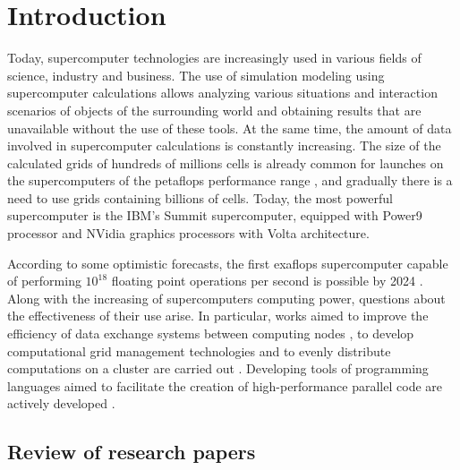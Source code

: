 \documentclass[
11pt,%
tightenlines,%
twoside,%
onecolumn,%
nofloats,%
nobibnotes,%
nofootinbib,%
superscriptaddress,%
noshowpacs,%
centertags]%
{revtex4}
\begin{document}
\maketitle


\section{Introduction}

Today, supercomputer technologies are increasingly used in various fields of science, industry and business. 
The use of simulation modeling using supercomputer calculations allows analyzing various situations and interaction scenarios of objects of the surrounding world and obtaining results that are unavailable without the use of these tools. 
At the same time, the amount of data involved in supercomputer calculations is constantly increasing. 
The size of the calculated grids of hundreds of millions cells is already common for launches on the supercomputers of the petaflops performance range \cite{Rettinger,Krappel}, and gradually there is a need to use grids containing billions of cells. 
Today, the most powerful supercomputer is the IBM's Summit supercomputer, equipped with Power9 processor and NVidia graphics processors with Volta architecture.

According to some optimistic forecasts, the first exaflops supercomputer capable of performing $ 10^{18} $ floating point operations per second is possible by 2024 \cite{Markidis}.
Along with the increasing of supercomputers computing power, questions about the effectiveness of their use arise. 
In particular, works aimed to improve the efficiency of data exchange systems between computing nodes \cite{Klenk,Abduljabbar}, to develop computational grid management technologies and to evenly distribute computations on a cluster are carried out \cite{Rybakov,Van,Benderskiy}. 
Developing tools of programming languages aimed to facilitate the creation of high-performance parallel code are actively developed \cite{Heller,Roganov}.

\subsection{Review of research papers}
\end{document}
